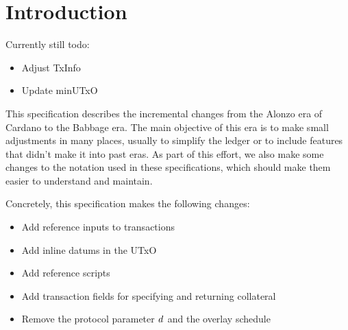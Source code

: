 \section{Introduction}

Currently still todo:

\begin{itemize}
\item Adjust TxInfo
\item Update minUTxO
\end{itemize}

This specification describes the incremental changes from the Alonzo
era of Cardano to the Babbage era. The main objective of this era is
to make small adjustments in many places, usually to simplify the
ledger or to include features that didn't make it into past eras. As
part of this effort, we also make some changes to the notation used in
these specifications, which should make them easier to understand and
maintain.

Concretely, this specification makes the following changes:
\begin{itemize}
\item Add reference inputs to transactions
\item Add inline datums in the UTxO
\item Add reference scripts
\item Add transaction fields for specifying and returning collateral
\item Remove the protocol parameter $\mathit{d}$ and the overlay schedule
\end{itemize}
